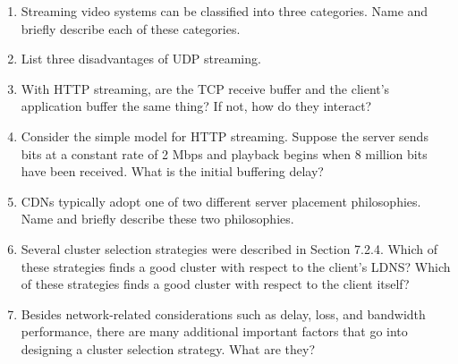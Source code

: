 \begin{enumerate}

\item Streaming video systems can be classified into three categories. Name and briefly describe each of these categories.


\item List three disadvantages of UDP streaming.


\item With HTTP streaming, are the TCP receive buffer and the client’s application buffer the same thing? If not, how do they interact?


\item Consider the simple model for HTTP streaming. Suppose the server sends bits at a constant rate of 2 Mbps and playback begins when 8 million bits have been received. What is the initial buffering delay?


\item  CDNs typically adopt one of two different server placement philosophies. Name and briefly describe these two philosophies.


\item  Several cluster selection strategies were described in Section 7.2.4. Which of these strategies finds a good cluster with respect to the client’s LDNS? Which of these strategies finds a good cluster with respect to the client itself?


\item  Besides network-related considerations such as delay, loss, and bandwidth performance, there are many additional important factors that go into designing a cluster selection strategy. What are they?


\end{enumerate}

